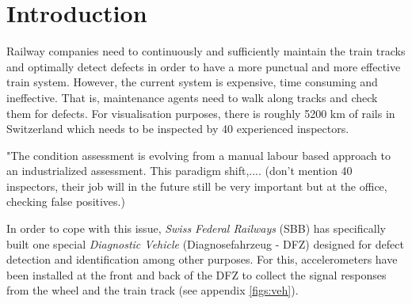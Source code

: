 



%



\maketitle

%
{
  \hypersetup{linkcolor=black}
  \tableofcontents
   
}
\newpage
\chapter{Introduction}
Railway companies need to continuously and sufficiently maintain the train tracks and optimally detect defects in order to have a more punctual and more effective train system. However, the current system is expensive, time consuming and ineffective. That is, maintenance agents need to walk along tracks and check them for defects. For visualisation purposes, there is roughly 5200 km of rails in Switzerland which needs to be inspected by 40 experienced inspectors.


"The condition assessment is evolving from a manual labour based approach to an industrialized assessment. This paradigm shift,.... (don't mention 40 inspectors, their job will in the future still be very important but at the office, checking false positives.)

In order to cope with this issue, \textit{Swiss Federal Railways} (SBB) has specifically built one special \textit{Diagnostic Vehicle} (Diagnosefahrzeug - DFZ) designed for defect detection and identification among other purposes. For this, accelerometers have been installed at the front and back of the DFZ to collect the signal responses from the wheel and the train track (see appendix \ref{figs:veh}).

